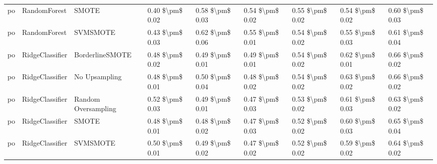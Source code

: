 \begin{tabular}{lllllllll}
      po &                    RandomForest &                         SMOTE &     0.40 \$\textbackslash pm\$ 0.02 &           0.58 \$\textbackslash pm\$ 0.03 &       0.54 \$\textbackslash pm\$ 0.02 &        0.55 \$\textbackslash pm\$ 0.02 &                         0.54 \$\textbackslash pm\$ 0.02 &     0.60 \$\textbackslash pm\$ 0.03 \\
      po &                    RandomForest &                      SVMSMOTE &     0.43 \$\textbackslash pm\$ 0.03 &           0.62 \$\textbackslash pm\$ 0.06 &       0.55 \$\textbackslash pm\$ 0.01 &        0.54 \$\textbackslash pm\$ 0.02 &                         0.55 \$\textbackslash pm\$ 0.03 &     0.61 \$\textbackslash pm\$ 0.04 \\
      po &                 RidgeClassifier &               BorderlineSMOTE &     0.48 \$\textbackslash pm\$ 0.02 &           0.49 \$\textbackslash pm\$ 0.01 &       0.49 \$\textbackslash pm\$ 0.01 &        0.54 \$\textbackslash pm\$ 0.02 &                         0.62 \$\textbackslash pm\$ 0.01 &     0.66 \$\textbackslash pm\$ 0.02 \\
      po &                 RidgeClassifier &                 No Upsampling &     0.48 \$\textbackslash pm\$ 0.01 &           0.50 \$\textbackslash pm\$ 0.04 &       0.48 \$\textbackslash pm\$ 0.02 &        0.54 \$\textbackslash pm\$ 0.02 &                         0.63 \$\textbackslash pm\$ 0.02 &     0.66 \$\textbackslash pm\$ 0.02 \\
      po &                 RidgeClassifier &           Random Oversampling &     0.52 \$\textbackslash pm\$ 0.03 &           0.49 \$\textbackslash pm\$ 0.01 &       0.47 \$\textbackslash pm\$ 0.03 &        0.53 \$\textbackslash pm\$ 0.02 &                         0.61 \$\textbackslash pm\$ 0.03 &     0.63 \$\textbackslash pm\$ 0.02 \\
      po &                 RidgeClassifier &                         SMOTE &     0.48 \$\textbackslash pm\$ 0.01 &           0.48 \$\textbackslash pm\$ 0.02 &       0.47 \$\textbackslash pm\$ 0.03 &        0.52 \$\textbackslash pm\$ 0.02 &                         0.60 \$\textbackslash pm\$ 0.03 &     0.65 \$\textbackslash pm\$ 0.04 \\
      po &                 RidgeClassifier &                      SVMSMOTE &     0.50 \$\textbackslash pm\$ 0.01 &           0.49 \$\textbackslash pm\$ 0.02 &       0.47 \$\textbackslash pm\$ 0.02 &        0.52 \$\textbackslash pm\$ 0.02 &                         0.59 \$\textbackslash pm\$ 0.02 &     0.64 \$\textbackslash pm\$ 0.02 \\

\end{tabular}
